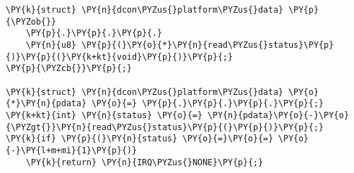 \begin{Verbatim}[commandchars=\\\{\},codes={\catcode`\$=3\catcode`\^=7\catcode`\_=8}]
\PY{k}{struct} \PY{n}{dcon\PYZus{}platform\PYZus{}data} \PY{p}{\PYZob{}}
    \PY{p}{.}\PY{p}{.}\PY{p}{.}
    \PY{n}{u8} \PY{p}{(}\PY{o}{*}\PY{n}{read\PYZus{}status}\PY{p}{)}\PY{p}{(}\PY{k+kt}{void}\PY{p}{)}\PY{p}{;}
\PY{p}{\PYZcb{}}\PY{p}{;}

\PY{k}{struct} \PY{n}{dcon\PYZus{}platform\PYZus{}data} \PY{o}{*}\PY{n}{pdata} \PY{o}{=} \PY{p}{.}\PY{p}{.}\PY{p}{.}\PY{p}{;}
\PY{k+kt}{int} \PY{n}{status} \PY{o}{=} \PY{n}{pdata}\PY{o}{-}\PY{o}{\PYZgt{}}\PY{n}{read\PYZus{}status}\PY{p}{(}\PY{p}{)}\PY{p}{;}
\PY{k}{if} \PY{p}{(}\PY{n}{status} \PY{o}{=}\PY{o}{=} \PY{o}{-}\PY{l+m+mi}{1}\PY{p}{)}
    \PY{k}{return} \PY{n}{IRQ\PYZus{}NONE}\PY{p}{;}
\end{Verbatim}
